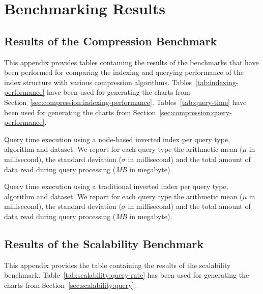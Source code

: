 \chapter{Benchmarking Results}

\section{Results of the Compression Benchmark}
\label{app:compression:results}

This appendix provides tables containing the results of the benchmarks that
have been performed for comparing the indexing and querying performance of the
index structure with various compression algorithms.
Tables~\ref{tab:indexing-performance} have been used for generating the charts
from Section~\ref{sec:compression:indexing-performance}.
Tables~\ref{tab:query-time} have been used for generating the charts from
Section~\ref{sec:compression:query-performance}.



\begin{table*}
\centering
{}

\caption{Query time execution using a node-based inverted index per query type,
algorithm and dataset. We report for each query type the arithmetic mean
($\mu$ in millisecond), the standard deviation ($\sigma$ in millisecond) and
the total amount of data read during query processing (\emph{MB} in megabyte).}
\label{tab:query-time}
\end{table*}

\begin{table*}
\centering
{}

\caption{Query time execution using a traditional inverted index per query type,
algorithm and dataset. We report for each query type the arithmetic mean
($\mu$ in millisecond), the standard deviation ($\sigma$ in millisecond) and
the total amount of data read during query processing (\emph{MB} in megabyte).}
\label{tab:query-time-TRAD}
\end{table*}


\section{Results of the Scalability Benchmark}
\label{app:scalability:results}

This appendix provides the table containing the results of the scalability
benchmark. Table~\ref{tab:scalability:query-rate} has been used for generating
the charts from Section~\ref{sec:scalability:query}.


